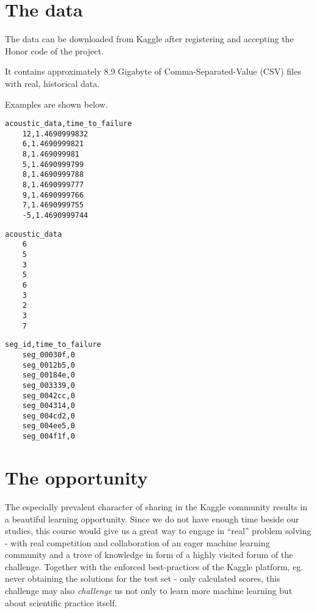 \documentclass[colorback,accentcolor=tud9c,12pt]{tudreport}
\begin{document}
	
	\section{The data}
	The data can be downloaded from Kaggle after registering and accepting the Honor code of the project.
	
	It contains approximately 8.9 Gigabyte of Comma-Separated-Value (CSV) files with real, historical data.
	
	Examples are shown below.
	
	\begin{lstlisting}[caption={Example values from the train set, \textit{train.csv}},captionpos=b]
	acoustic_data,time_to_failure
	12,1.4690999832
	6,1.4690999821
	8,1.469099981
	5,1.4690999799
	8,1.4690999788
	8,1.4690999777
	9,1.4690999766
	7,1.4690999755
	-5,1.4690999744
	\end{lstlisting}
	
	\begin{lstlisting}[caption={Example values from the test set, \textit{seg\_ff7478.csv}},captionpos=b]
	acoustic_data
	6
	5
	3
	5
	6
	3
	2
	3
	7
	\end{lstlisting}
	
	
	\begin{lstlisting}[caption={Example submission file, \textit{sample\_submission.csv}},captionpos=b]
	seg_id,time_to_failure
	seg_00030f,0
	seg_0012b5,0
	seg_00184e,0
	seg_003339,0
	seg_0042cc,0
	seg_004314,0
	seg_004cd2,0
	seg_004ee5,0
	seg_004f1f,0
	\end{lstlisting}
	
	
	\section{The opportunity}
	The especially prevalent character of sharing in the Kaggle community results in a beautiful learning opportunity. Since we do not have enough time beside our studies, this course would give us a great way to engage in ``real'' problem solving - with real competition and collaboration of an eager machine learning community and a trove of knowledge in form of a highly visited forum of the challenge.
	Together with the enforced best-practices of the Kaggle platform, eg. never obtaining the solutions for the test set - only calculated scores, this challenge may also \textit{challenge} us not only to learn more machine learning but about scientific practice itself.
	
	
\end{document}
